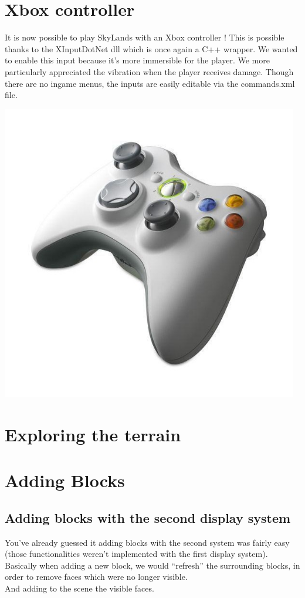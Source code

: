 \documentclass[article]{report}         %
\begin{document}
	\section{Xbox controller}
		It is now possible to play SkyLands with an Xbox controller ! This is possible thanks to the XInputDotNet dll which is once again a C++ wrapper. We wanted to enable this input because it's more immersible for the player. We more particularly appreciated the vibration when the player receives damage. Though there are no ingame menus, the inputs are easily editable via the commands.xml file. 
\begin{center}
\includegraphics[width=13cm]{images/xbox360.jpg}
\end{center}      

\section{Exploring the terrain}
      \section{Adding Blocks}
        \subsection{Adding blocks with the second display system}
          You've already guessed it adding blocks with the second system was fairly easy (those functionalities weren't implemented with the first display system).\\
          Basically when adding a new block, we would ``refresh'' the surrounding blocks, in order to remove faces which were no longer visible.\\
          And adding to the scene the visible faces.
\end{document}
